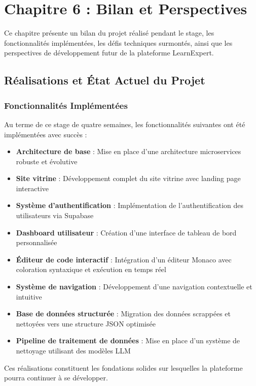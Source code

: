 \chapter{Chapitre 6 : Bilan et Perspectives}
\thispagestyle{fancy}
\newpage

Ce chapitre présente un bilan du projet réalisé pendant le stage, les fonctionnalités implémentées, les défis techniques surmontés, ainsi que les perspectives de développement futur de la plateforme LearnExpert.

\section{Réalisations et État Actuel du Projet}

\subsection{Fonctionnalités Implémentées}
Au terme de ce stage de quatre semaines, les fonctionnalités suivantes ont été implémentées avec succès :

\begin{itemize}
  \item \textbf{Architecture de base} : Mise en place d'une architecture microservices robuste et évolutive
  \item \textbf{Site vitrine} : Développement complet du site vitrine avec landing page interactive
  \item \textbf{Système d'authentification} : Implémentation de l'authentification des utilisateurs via Supabase
  \item \textbf{Dashboard utilisateur} : Création d'une interface de tableau de bord personnalisée
  \item \textbf{Éditeur de code interactif} : Intégration d'un éditeur Monaco avec coloration syntaxique et exécution en temps réel
  \item \textbf{Système de navigation} : Développement d'une navigation contextuelle et intuitive
  \item \textbf{Base de données structurée} : Migration des données scrappées et nettoyées vers une structure JSON optimisée
  \item \textbf{Pipeline de traitement de données} : Mise en place d'un système de nettoyage utilisant des modèles LLM
\end{itemize}

Ces réalisations constituent les fondations solides sur lesquelles la plateforme pourra continuer à se développer.

